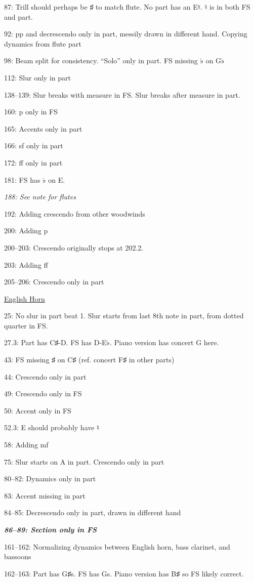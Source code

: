 \documentclass[twoside]{article}
\begin{document}
\begin{hangparas}{15pt}{1}
\begin{multicols}{2}
87: Trill should perhaps be ♯ to match flute. No part has an E♮. ♮ is in both FS and part.

92: pp and decrescendo only in part, messily drawn in different hand. Copying dynamics from flute part

98: Beam split for consistency. ``Solo'' only in part. FS missing ♭ on G♭

112: Slur only in part

138--139: Slur breaks with measure in FS. Slur breaks after measure in part.

160: p only in FS

165: Accents only in part

166: sf only in part

172: ff only in part

181: FS has ♭ on E.

\textit{188: See note for flutes}

192: Adding crescendo from other woodwinds

200: Adding p

200--203: Crescendo originally stops at 202.2.

203: Adding ff

205--206: Crescendo only in part

\underline{English Horn}

25: No slur in part beat 1. Slur starts from last 8th note in part, from dotted quarter in FS.

27.3: Part has C♯-D. FS has D-E♭. Piano version has concert G here.

43: FS missing ♯ on C♯ (ref. concert F♯ in other parts)

44: Crescendo only in part

49: Crescendo only in FS

50: Accent only in FS

52.3: E should probably have ♮

58: Adding mf

75: Slur starts on A in part. Crescendo only in part

80--82: Dynamics only in part

83: Accent missing in part

84--85: Decrescendo only in part, drawn in different hand

\textbf{\textit{86--89: Section only in FS}}

161--162: Normalizing dynamics between English horn, bass clarinet, and bassoons

162--163: Part has G♯s. FS has Gs. Piano version has B♯ so FS likely correct.


\end{multicols}
\end{hangparas}
\end{document}
